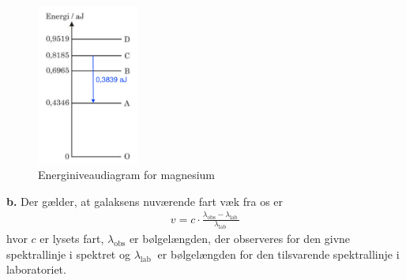 \documentclass{report}
\begin{document}
\begin{figure}[H]
\begin{center}
  \includegraphics[width=0.3\textwidth]{energi.png}
\end{center}
\caption{Energiniveaudiagram for magnesium}
\label{fig:energi}
\end{figure}
\noindent \textbf{b.}
Der gælder, at galaksens nuværende fart væk fra os er 
\begin{equation*}
\begin{split}
v=c \cdot \frac{\lambda _{\text{obs} }-\lambda _{\text{lab } }}{\lambda _{\text{lab } }}
\end{split}
\end{equation*}
hvor $c$ er lysets fart, $\lambda _{\text{obs} }$ er bølgelængden, der observeres for den givne spektrallinje i spektret og $\lambda _{\text{lab } }$ er bølgelængden for den tilsvarende spektrallinje i laboratoriet. 
\end{document}
